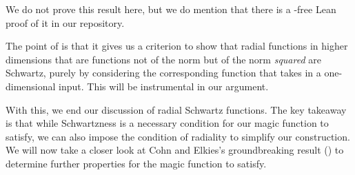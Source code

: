 We do not prove this result here, but we do mention that there is a \sorry-free Lean proof of it in our repository.

The point of  is that it gives us a criterion to show that radial functions in higher dimensions that are functions not of the norm but of the norm \textit{squared} are Schwartz, purely by considering the corresponding function that takes in a one-dimensional input. This will be instrumental in our argument.

With this, we end our discussion of radial Schwartz functions. The key takeaway is that while Schwartzness is a necessary condition for our magic function to satisfy, we can also impose the condition of radiality to simplify our construction. We will now take a closer look at Cohn and Elkies's groundbreaking result () to determine further properties for the magic function to satisfy.